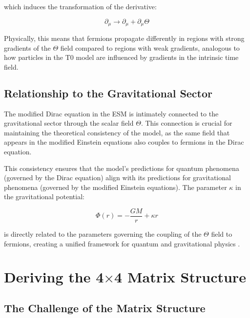 \documentclass[12pt,a4paper]{article}
\begin{document}
	which induces the transformation of the derivative:
	
	\begin{equation}
		\partial_{\mu} \rightarrow \partial_{\mu} + \partial_{\mu}\Theta
		\label{eq:derivative_transform}
	\end{equation}
	
	Physically, this means that fermions propagate differently in regions with strong gradients of the $\Theta$ field compared to regions with weak gradients, analogous to how particles in the T0 model are influenced by gradients in the intrinsic time field.
	
	\subsection{Relationship to the Gravitational Sector}
	\label{subsec:gravitational_relationship}
	
	The modified Dirac equation in the ESM is intimately connected to the gravitational sector through the scalar field $\Theta$. This connection is crucial for maintaining the theoretical consistency of the model, as the same field that appears in the modified Einstein equations also couples to fermions in the Dirac equation.
	
	This consistency ensures that the model's predictions for quantum phenomena (governed by the Dirac equation) align with its predictions for gravitational phenomena (governed by the modified Einstein equations). The parameter $\kappa$ in the gravitational potential:
	
	\begin{equation}
		\Phi(r) = -\frac{GM}{r} + \kappa r
		\label{eq:modified_potential}
	\end{equation}
	
	is directly related to the parameters governing the coupling of the $\Theta$ field to fermions, creating a unified framework for quantum and gravitational physics \cite{pascher_esm_comparison_2025}.
	
	\section{Deriving the 4$\times$4 Matrix Structure}
	\label{sec:matrix_structure}
	
	\subsection{The Challenge of the Matrix Structure}
	\label{subsec:matrix_challenge}
	
\end{document}
